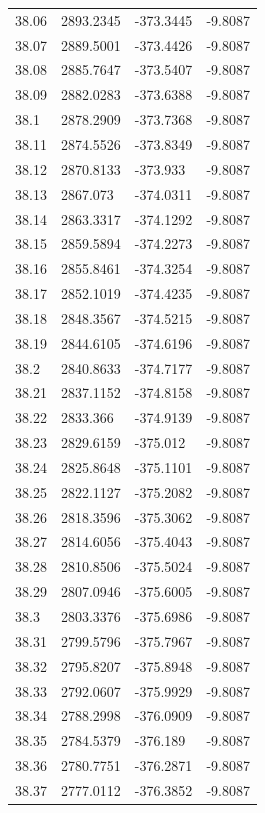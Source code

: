 \begin{table}[H]
\begin{tabular}{llll}
38.06 & 2893.2345 & -373.3445 & -9.8087 \\
38.07 & 2889.5001 & -373.4426 & -9.8087 \\
38.08 & 2885.7647 & -373.5407 & -9.8087 \\
38.09 & 2882.0283 & -373.6388 & -9.8087 \\
38.1 & 2878.2909 & -373.7368 & -9.8087 \\
38.11 & 2874.5526 & -373.8349 & -9.8087 \\
38.12 & 2870.8133 & -373.933 & -9.8087 \\
38.13 & 2867.073 & -374.0311 & -9.8087 \\
38.14 & 2863.3317 & -374.1292 & -9.8087 \\
38.15 & 2859.5894 & -374.2273 & -9.8087 \\
38.16 & 2855.8461 & -374.3254 & -9.8087 \\
38.17 & 2852.1019 & -374.4235 & -9.8087 \\
38.18 & 2848.3567 & -374.5215 & -9.8087 \\
38.19 & 2844.6105 & -374.6196 & -9.8087 \\
38.2 & 2840.8633 & -374.7177 & -9.8087 \\
38.21 & 2837.1152 & -374.8158 & -9.8087 \\
38.22 & 2833.366 & -374.9139 & -9.8087 \\
38.23 & 2829.6159 & -375.012 & -9.8087 \\
38.24 & 2825.8648 & -375.1101 & -9.8087 \\
38.25 & 2822.1127 & -375.2082 & -9.8087 \\
38.26 & 2818.3596 & -375.3062 & -9.8087 \\
38.27 & 2814.6056 & -375.4043 & -9.8087 \\
38.28 & 2810.8506 & -375.5024 & -9.8087 \\
38.29 & 2807.0946 & -375.6005 & -9.8087 \\
38.3 & 2803.3376 & -375.6986 & -9.8087 \\
38.31 & 2799.5796 & -375.7967 & -9.8087 \\
38.32 & 2795.8207 & -375.8948 & -9.8087 \\
38.33 & 2792.0607 & -375.9929 & -9.8087 \\
38.34 & 2788.2998 & -376.0909 & -9.8087 \\
38.35 & 2784.5379 & -376.189 & -9.8087 \\
38.36 & 2780.7751 & -376.2871 & -9.8087 \\
38.37 & 2777.0112 & -376.3852 & -9.8087 \\

\end{tabular}
\end{table}
